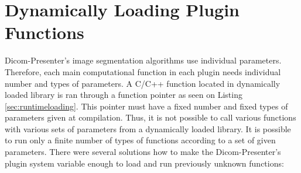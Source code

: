 


\section{Dynamically Loading Plugin Functions}

Dicom-Presenter's image segmentation algorithms use individual parameters. Therefore, each main computational function in each plugin needs individual number and types of parameters. A C/C++ function located in dynamically loaded library is ran through a function pointer as seen on Listing \ref{sec:runtimeloading}. This pointer must have a fixed number and fixed types of parameters given at compilation. Thus, it is not possible to call various functions with various sets of parameters from a dynamically loaded library. It is possible to run only a finite number of types of functions according to a set of given parameters. There were several solutions how to make the Dicom-Presenter's plugin system variable enough to load and run previously unknown functions:

